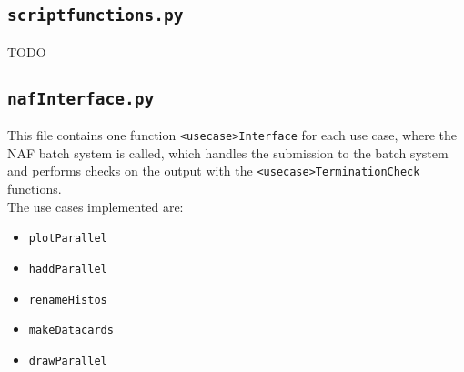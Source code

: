 \documentclass[12pt, a4paper]{article}
\begin{document}
\subsection{\texttt{scriptfunctions.py}}
\label{scriptfunctions}
TODO





\subsection{\texttt{nafInterface.py}}
This file contains one function \texttt{<usecase>Interface} for each use case, where the NAF batch system is called, which handles the submission to the batch system and performs checks on the output with the \texttt{<usecase>TerminationCheck} functions.\\
The use cases implemented are:
\begin{itemize}
\itemsep-0.5em
\item \texttt{plotParallel}
\item \texttt{haddParallel}
\item \texttt{renameHistos}
\item \texttt{makeDatacards}
\item \texttt{drawParallel}
\end{itemize}
\end{document}
